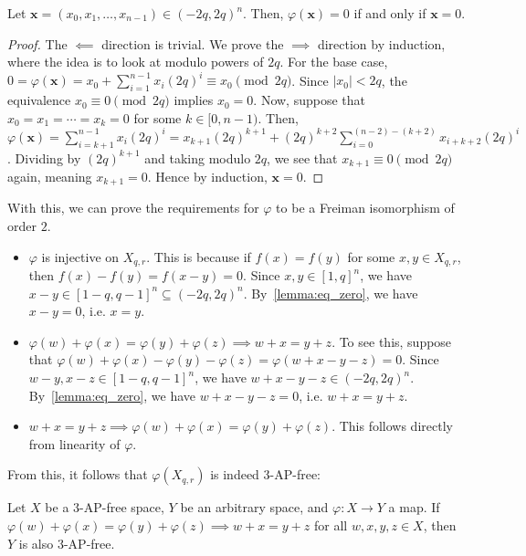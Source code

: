 \begin{lemma} \label{lemma:eq_zero}
  Let \(\mathbf{x} = (x_0, x_1, \ldots, x_{n - 1}) \in (-2q, 2q)^n\). Then, \(\varphi(\mathbf{x}) = 0\) if and only if \(\mathbf{x} = 0\).
\end{lemma}

\begin{proof}
  The \(\impliedby\) direction is trivial. We prove the \(\implies\) direction by induction, where the idea is to look at modulo powers of \(2q\). For the base case, \(0 = \varphi(\mathbf{x}) = x_0 + \sum_{i = 1}^{n - 1} x_i(2q)^i \equiv x_0 \pmod{2q}\). Since \(|x_0| < 2q\), the equivalence \(x_0 \equiv 0 \pmod{2q}\) implies \(x_0 = 0\). Now, suppose that \(x_0 = x_1 = \cdots = x_k = 0\) for some \(k \in [0, n - 1)\). Then, \(\varphi(\mathbf{x}) = \sum_{i = k + 1}^{n - 1} x_i(2q)^i = x_{k + 1}(2q)^{k + 1} + (2q)^{k + 2} \sum_{i = 0}^{(n - 2) - (k + 2)} x_{i + k + 2}(2q)^i\). Dividing by \((2q)^{k + 1}\) and taking modulo \(2q\), we see that \(x_{k + 1} \equiv 0 \pmod{2q}\) again, meaning \(x_{k + 1} = 0\). Hence by induction, \(\mathbf{x} = 0\).
\end{proof}

With this, we can prove the requirements for \(\varphi\) to be a Freiman isomorphism of order \(2\).

\begin{itemize}
  \item \(\varphi\) is injective on \(X_{q, r}\). This is because if \(f(x) = f(y)\) for some \(x, y \in X_{q, r}\), then \(f(x) - f(y) = f(x - y) = 0\). Since \(x, y \in [1, q]^n\), we have \(x - y \in [1 - q, q - 1]^n \subseteq (-2q, 2q)^n\). By~\cref{lemma:eq_zero}, we have \(x - y = 0\), i.e. \(x = y\).
  \item \(\varphi(w) + \varphi(x) = \varphi(y) + \varphi(z) \implies w + x = y + z\). To see this, suppose that \(\varphi(w) + \varphi(x) - \varphi(y) - \varphi(z) = \varphi(w + x - y - z) = 0\). Since \(w - y, x - z \in [1 - q, q - 1]^n\), we have \(w + x - y - z \in (-2q, 2q)^n\). By~\cref{lemma:eq_zero}, we have \(w + x - y - z = 0\), i.e. \(w + x = y + z\).
  \item \(w + x = y + z \implies \varphi(w) + \varphi(x) = \varphi(y) + \varphi(z)\). This follows directly from linearity of \(\varphi\).
\end{itemize}

From this, it follows that \(\varphi(X_{q, r})\) is indeed \(3\)-AP-free:

\begin{lemma} \label{lemma:hyp_3ap}
  Let \(X\) be a \(3\)-AP-free space, \(Y\) be an arbitrary space, and \(\varphi : X \to Y\) a map. If \(\varphi(w) + \varphi(x) = \varphi(y) + \varphi(z) \implies w + x = y + z\) for all \(w, x, y, z \in X\), then \(Y\) is also \(3\)-AP-free.
\end{lemma}


